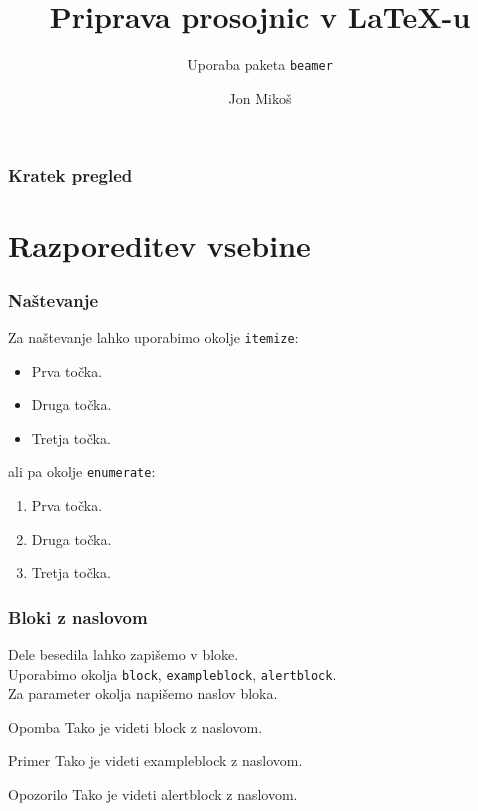 \documentclass{beamer}
\begin{document}
\title{Priprava prosojnic v {\LaTeX}-u}
\subtitle{Uporaba paketa \texttt{beamer}}
\author{Jon Mikoš}
\date{}

\begin{frame}
   \titlepage
\end{frame}
\begin{frame}
   \frametitle{Kratek pregled}
   \tableofcontents
\end{frame}
\section{Razporeditev vsebine}
\begin{frame}
   \frametitle{Naštevanje}
   Za naštevanje lahko uporabimo okolje \texttt{itemize}:
   \begin{itemize}
      \item Prva točka.
      \item Druga točka.
      \item Tretja točka.
   \end{itemize}
   ali pa okolje \texttt{enumerate}:
   \begin{enumerate}
      \item Prva točka.
      \item Druga točka.
      \item Tretja točka.
   \end{enumerate}
\end{frame}
\begin{frame}
   \frametitle{Bloki z naslovom}
   Dele besedila lahko zapišemo v bloke.\\
   Uporabimo okolja \texttt{block}, \texttt{exampleblock}, \texttt{alertblock}.\\
   Za parameter okolja napišemo naslov bloka.\\
   \begin{block}{Opomba}
      Tako je videti block z naslovom.
   \end{block}
   \begin{exampleblock}{Primer}
      Tako je videti exampleblock z naslovom.
   \end{exampleblock}
   \begin{alertblock}{Opozorilo}
      Tako je videti alertblock z naslovom.
   \end{alertblock}
\end{frame}
\end{document}
